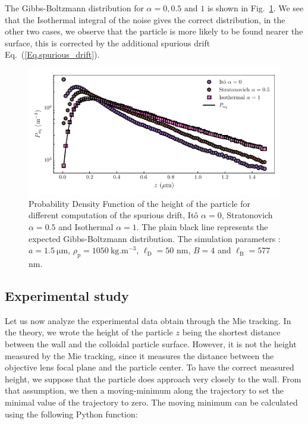 The Gibbs-Boltzmann distribution for $\alpha = 0 , 0.5 \text{ and } 1 $ is shown in Fig.~\ref{fig.pdf_vs_alpha}. We see that the Isothermal integral of the noise gives the correct distribution, in the other two cases, we observe that the particle is more likely to be found nearer the surface, this is corrected by the additional spurious drift Eq.~(\ref{Eq.spurious_drift}).

\begin{figure}[h!]
	\centering
	\includegraphics{02_body/chapter3/images/simulation_confined_Brownian_motion/Peq_vs_alpha.pdf}
	\caption{Probability Density Function of the height of the particle for different computation of the spurious drift, Itô $\alpha = 0$, Stratonovich $\alpha = 0.5$ and Isothermal $\alpha = 1$. The plain black line represents the expected Gibbs-Boltzmann distribution. The simulation parameters : $a = 1.5 ~ \mathrm{\mu m}$, $\rho_\mathrm{p} = 1050 ~\mathrm{kg.m^{-3}}$, $\ell_\mathrm{D} = 50$ nm, $B = 4$ and $\ell_\mathrm{B} = 577$ nm. }
	\label{fig.pdf_vs_alpha}
\end{figure}


\subsection{Experimental study}
\label{section:expresults}
Let us now analyze the experimental data obtain through the Mie tracking. In the theory, we wrote the height of the particle $z$ being the shortest distance between the wall and the colloidal particle surface. However, it is not the height measured by the Mie tracking, since it measures the distance between the objective lens focal plane and the particle center. To have the correct measured height, we suppose that the particle does approach very closely to the wall. From that assumption, we then a moving-minimum along the trajectory to set the minimal value of the trajectory to zero. The moving minimum can be calculated using the following Python function:



